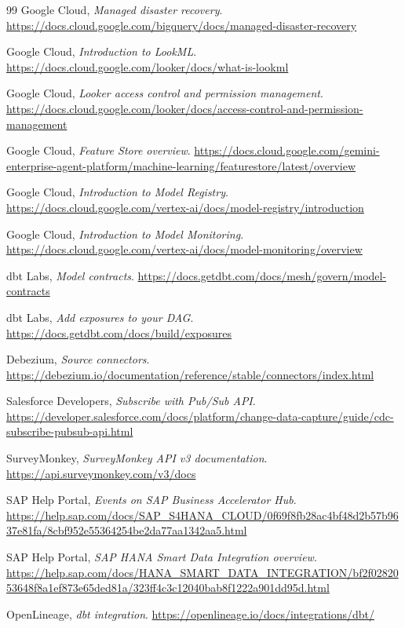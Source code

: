 \documentclass[10pt,a4paper]{article}
\begin{document}
\begin{thebibliography}{99}
Google Cloud, \emph{Managed disaster recovery}.
\url{https://docs.cloud.google.com/bigquery/docs/managed-disaster-recovery}

Google Cloud, \emph{Introduction to LookML}.
\url{https://docs.cloud.google.com/looker/docs/what-is-lookml}

Google Cloud, \emph{Looker access control and permission management}.
\url{https://docs.cloud.google.com/looker/docs/access-control-and-permission-management}

Google Cloud, \emph{Feature Store overview}.
\url{https://docs.cloud.google.com/gemini-enterprise-agent-platform/machine-learning/featurestore/latest/overview}

Google Cloud, \emph{Introduction to Model Registry}.
\url{https://docs.cloud.google.com/vertex-ai/docs/model-registry/introduction}

Google Cloud, \emph{Introduction to Model Monitoring}.
\url{https://docs.cloud.google.com/vertex-ai/docs/model-monitoring/overview}

dbt Labs, \emph{Model contracts}.
\url{https://docs.getdbt.com/docs/mesh/govern/model-contracts}

dbt Labs, \emph{Add exposures to your DAG}.
\url{https://docs.getdbt.com/docs/build/exposures}

Debezium, \emph{Source connectors}.
\url{https://debezium.io/documentation/reference/stable/connectors/index.html}

Salesforce Developers, \emph{Subscribe with Pub/Sub API}.
\url{https://developer.salesforce.com/docs/platform/change-data-capture/guide/cdc-subscribe-pubsub-api.html}

SurveyMonkey, \emph{SurveyMonkey API v3 documentation}.
\url{https://api.surveymonkey.com/v3/docs}

SAP Help Portal, \emph{Events on SAP Business Accelerator Hub}.
\url{https://help.sap.com/docs/SAP_S4HANA_CLOUD/0f69f8fb28ac4bf48d2b57b9637e81fa/8cbf952e55364254be2da77aa1342aa5.html}

SAP Help Portal, \emph{SAP HANA Smart Data Integration overview}.
\url{https://help.sap.com/docs/HANA_SMART_DATA_INTEGRATION/bf2f0282053648f8a1ef873e65ded81a/323ff4c3c12040bab8f1222a901dd95d.html}

OpenLineage, \emph{dbt integration}.
\url{https://openlineage.io/docs/integrations/dbt/}


\end{thebibliography}
\end{document}
